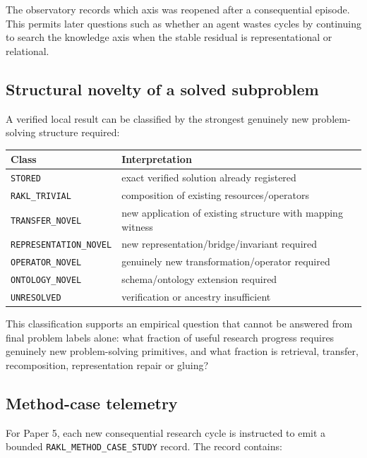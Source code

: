 The observatory records which axis was reopened after a consequential episode. This permits later questions such as whether an agent wastes cycles by continuing to search the knowledge axis when the stable residual is representational or relational.

\subsection{Structural novelty of a solved subproblem}

A verified local result can be classified by the strongest genuinely new problem-solving structure required:

\begin{center}
\begin{tabular}{ll}
\toprule
Class & Interpretation \\
\midrule
\texttt{STORED} & exact verified solution already registered \\
\texttt{RAKL\_TRIVIAL} & composition of existing resources/operators \\
\texttt{TRANSFER\_NOVEL} & new application of existing structure with mapping witness \\
\texttt{REPRESENTATION\_NOVEL} & new representation/bridge/invariant required \\
\texttt{OPERATOR\_NOVEL} & genuinely new transformation/operator required \\
\texttt{ONTOLOGY\_NOVEL} & schema/ontology extension required \\
\texttt{UNRESOLVED} & verification or ancestry insufficient \\
\bottomrule
\end{tabular}
\end{center}

This classification supports an empirical question that cannot be answered from final problem labels alone: what fraction of useful research progress requires genuinely new problem-solving primitives, and what fraction is retrieval, transfer, recomposition, representation repair or gluing?

\subsection{Method-case telemetry}

For Paper 5, each new consequential research cycle is instructed to emit a bounded \texttt{RAKL\_METHOD\_CASE\_STUDY} record. The record contains:

